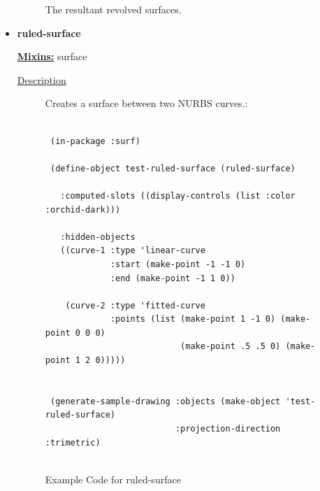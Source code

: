 \documentclass [11pt]{book}
\begin{document}
\begin{itemize}
\begin{description}
 The resultant revolved surfaces.




\end{description}







\item {}
\label{prim:ruled-surface}
\textbf{ruled-surface}


\textbf{
\underline{Mixins:}} surface





\begin{description}

\item [
\underline{Description}]


Creates a surface between two NURBS curves.:



\end{description}




\begin{figure}
\begin{lrbox}{\boxedverb}
\begin{minipage}{\linewidth}
{\small

\begin{verbatim}
                  
 (in-package :surf)

 (define-object test-ruled-surface (ruled-surface)
  
   :computed-slots ((display-controls (list :color :orchid-dark)))

   :hidden-objects
   ((curve-1 :type 'linear-curve
             :start (make-point -1 -1 0)
             :end (make-point -1 1 0))
   
    (curve-2 :type 'fitted-curve
             :points (list (make-point 1 -1 0) (make-point 0 0 0) 
                           (make-point .5 .5 0) (make-point 1 2 0)))))


 (generate-sample-drawing :objects (make-object 'test-ruled-surface)
                          :projection-direction :trimetric)


\end{verbatim}}
\end{minipage}
\end{lrbox}
\fbox{\usebox{\boxedverb}}

\caption{Example Code for ruled-surface}


\end{figure}
\end{itemize}
\end{document}
